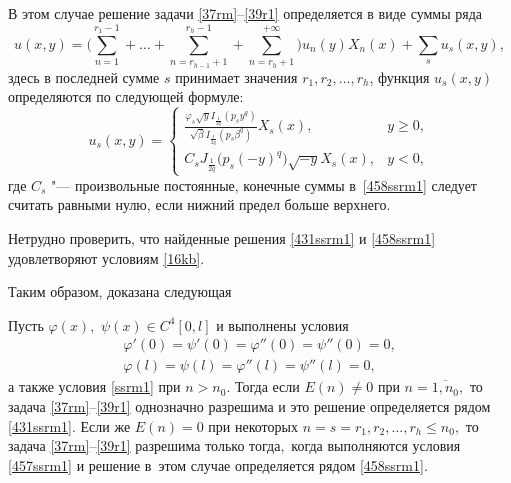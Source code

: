 В этом случае решение задачи \eqref{37rm}--\eqref{39r1} определяется в виде суммы ряда
\begin{equation}
\label{458ssrm1}
u(x,y)=\biggl(\sum_{n=1}^{r_{1}-1}+ \dots +\sum_{n=r_{h-1}+1}^{r_{h}-1}+\sum_{n=r_{h}+1}^{+\infty}\biggr)u_{n}(y)X_{n}(x)+\sum_{s}u_{s}(x,y),
\end{equation}
здесь в последней сумме $s$ принимает значения $r_{1}, r_{2},\dots, r_{h}$, функция $u_{s}(x,y)$ определяются по следующей формуле:
\begin{equation*}
u_{s}(x,y)= \left\{
\begin{array}{cl}
\displaystyle
\frac{\varphi_{s}\sqrt{y}I_{\frac{1}{2q}}(p_{s}y^{q})}{\sqrt{\beta}I_{\frac{1}{2q}}(p_{s}\beta^{q})}X_{s}(x),
 & y\geq 0, \\[2mm]
 \displaystyle
C_{s}J_{\frac{1}{2q}}\bigl(p_{s}(-y)^{q}\bigr)\sqrt{-y}X_{s}(x),  &
y<0,
\end{array}
\right.
\end{equation*}
где $C_{s}$ "--- произвольные постоянные, конечные суммы в~\eqref{458ssrm1} следует считать равными нулю, если нижний предел больше верхнего.

Нетрудно проверить, что найденные решения \eqref{431ssrm1} и \eqref{458ssrm1} удовлетворяют условиям \eqref{16kb}.


Таким образом, доказана следующая

\smallskip

\begin{theorem}[2]Пусть  $\varphi(x),$ $ \psi(x) \in C^{4}[0, l]$ и выполнены условия
\begin{gather}
\varphi'(0)=\psi'(0)=\varphi''(0)=\psi''(0)=0,
\\
\varphi(l)=\psi(l)=\varphi''(l)=\psi''(l)=0,
\end{gather} 
а также условия \eqref{ssrm1} при $n>n_{0}.$   
Тогда если $E(n)\neq 0$ при $n=\overline{1, n_{0}},$ то задача \eqref{37rm}--\eqref{39r1}
однозначно разрешима и это решение определяется рядом \eqref{431ssrm1}$.$  
Если же $E(n)=0$ при некоторых $n=s=r_{1}, r_{2}, \dots, r_{h}\leq n_{0},$  то задача \eqref{37rm}--\eqref{39r1}
разрешима только тогда$,$ когда выполняются условия \eqref{457ssrm1} и решение в~этом случае определяется рядом \eqref{458ssrm1}$.$
\end{theorem}



